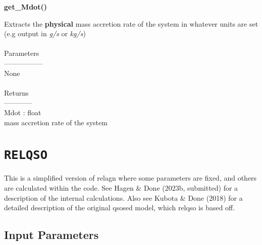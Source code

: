 \documentclass[a4paper, 11pt, times, onecolumn]{article}
\begin{document}
\vspace{1cm}

\noindent
{\bf get\_Mdot()}
\begin{adjustwidth}{1.5cm}{}

	\noindent
	Extracts the {\bf physical} mass accretion rate of the system in whatever units are set (e.g output in {\it g/s} or {\it kg/s}) 
	\\~\\
	Parameters\\
	-----------------\\
	\indent None
	\\~\\
	Returns \\
	------------\\ 
	\indent Mdot : float \\
	\indent {} mass accretion rate of the system

\end{adjustwidth}





\section{{\tt RELQSO}}

This is a simplified version of {\sc relagn} where some parameters are fixed, and others are calculated within the code. See Hagen \& Done (2023b, submitted) for a description of the internal calculations. Also see Kubota \& Done (2018) for a detailed description of the original {\sc qsosed} model, which {\sc relqso} is based off.

\subsection{Input Parameters}
\end{document}
